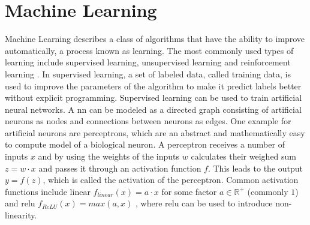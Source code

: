 \section{Machine Learning}
Machine Learning describes a class of algorithms that have the ability to improve automatically, a process known as learning. The most commonly used types of learning include supervised learning, unsupervised learning and reinforcement learning \cite{Dey2016}. In supervised learning, a set of labeled data, called training data, is used to improve the parameters of the algorithm to make it predict labels better without explicit programming. Supervised learning can be used to train artificial neural networks. A \ac{nn} can be modeled as a directed graph consisting of artificial neurons as nodes and connections between neurons as edges. One example for artificial neurons are perceptrons, which are an abstract and mathematically easy to compute model of a biological neuron. A perceptron receives a number of inputs $x$ and by using the weights of the inputs $w$ calculates their weighed sum $z=w \cdot x$ and passes it through an activation function $f$. This leads to the output
$y=f(z)$, which is called the activation of the perceptron. Common activation functions include linear $f_{linear}(x)=a \cdot x$ for some factor $a \in \mathbb{R^+}$ (commonly $1$) and \ac{relu} $f_{ReLU}(x)=max(a,x)$ \cite{Ramachandran2017}, where \ac{relu} can be used to introduce non-linearity.

